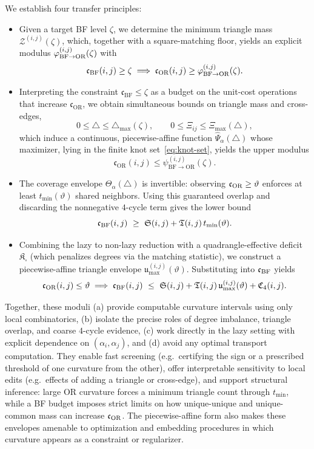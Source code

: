 \documentclass[twoside,11pt]{article}
\numberwithin{equation}{section}
\numberwithin{theorem}{section}
\numberwithin{example}{section}
\begin{document}
We establish four transfer principles:
\begin{itemize}

\item[(i)]  
Given a target BF level \(\zeta\), we determine the minimum triangle mass \(\mathscr Z^{(i,j)}(\zeta)\), which, together with a square-matching floor, yields an explicit modulus \(\varphi^{(i,j)}_{\rm BF\to OR}(\zeta)\) with
\[
\mathfrak c_{\rm BF}(i,j)\ge \zeta 
\implies
\mathfrak c_{\rm OR}(i,j)\ge \varphi^{(i,j)}_{\rm BF\to OR}(\zeta).
\]

\item[(ii)]  
Interpreting the constraint \(\mathfrak c_{\mathrm{BF}}\le \zeta\) as a budget on the unit-cost operations that increase \(\mathfrak c_{\mathrm{OR}}\), we obtain simultaneous bounds on triangle mass and cross-edges,
\[
0 \le \triangle \le \triangle_{\max}(\zeta), \qquad
0 \le \Xi_{ij} \le \Xi_{\max}(\triangle),
\]
which induce a continuous, piecewise-affine function \(\widehat{\Psi}_\alpha(\triangle)\) whose maximizer, lying in the finite knot set~\eqref{eq:knot-set}, yields the upper modulus
\[
\mathfrak c_{\mathrm{OR}}(i,j) \le \psi^{(i,j)}_{\mathrm{BF}\to \mathrm{OR}}(\zeta).
\]


\item[(iii)]  
The coverage envelope \(\Theta_\alpha(\triangle)\) is invertible: observing \(\mathfrak c_{\rm OR}\ge \vartheta\) enforces at least \(t_{\min}(\vartheta)\) shared neighbors.  
Using this guaranteed overlap and discarding the nonnegative $4$-cycle term gives the lower bound
\[
\mathfrak c_{\rm BF}(i,j)\ \ge\ \mathfrak S(i,j)+\mathfrak T(i,j)\,t_{\min}(\vartheta).
\]

\item[(iv)]  
Combining the lazy to non-lazy reduction with a quadrangle-effective deficit \(\mathfrak K_\square\) (which penalizes degrees via the matching statistic), we construct a piecewise-affine triangle envelope \(\mathfrak u_{\max}^{(i,j)}(\vartheta)\).  
Substituting into \(\mathfrak c_{\rm BF}\) yields
\[
\mathfrak c_{\rm OR}(i,j)\le \vartheta
\implies
\mathfrak c_{\rm BF}(i,j)
\ \le\ 
\mathfrak S(i,j)+\mathfrak T(i,j)\,\mathfrak u_{\max}^{(i,j)}(\vartheta)+\mathfrak C_4(i,j).
\]

\end{itemize}
Together, these moduli (a) provide computable curvature intervals using only local combinatorics, (b) isolate the precise roles of degree imbalance, triangle overlap, and coarse $4$-cycle evidence, (c) work directly in the lazy setting with explicit dependence on \((\alpha_i,\alpha_j)\), and (d) avoid any optimal transport computation.  
They enable fast screening (e.g.\ certifying the sign or a prescribed threshold of one curvature from the other), offer interpretable sensitivity to local edits (e.g.\ effects of adding a triangle or cross-edge), and support structural inference: large OR curvature forces a minimum triangle count through \(t_{\min}\), while a BF budget imposes strict limits on how unique-unique and unique-common mass can increase \(\mathfrak c_{\rm OR}\).  
The piecewise-affine form also makes these envelopes amenable to optimization and embedding procedures in which curvature appears as a constraint or regularizer.
\end{document}
